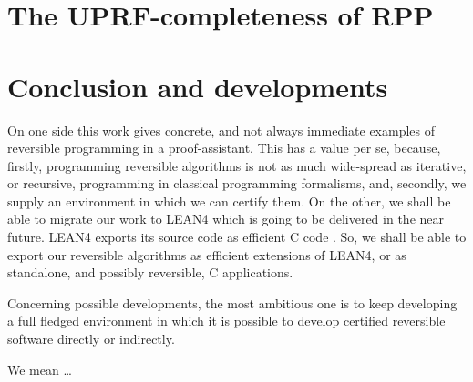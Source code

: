 \documentclass[runningheads]{llncs}
\newcommand{\RPP}{\textsf{RPP}\xspace}
\newcommand{\UPRF}{\textsf{UPRF}\xspace}
\newcommand{\CPP}{\textsf{C}\xspace}
\newcommand{\LEANFour}{\textsf{LEAN4}\xspace}
\begin{document}
\section{The \UPRF-completeness of \RPP}
\label{section:The UPRF-completeness of RPP}

\section{Conclusion and developments}
\label{section:Conclusion and developments}
On one side this work gives concrete, and not always immediate examples of reversible programming in a proof-assistant. This has a value per se, because, firstly, programming reversible algorithms is not as much wide-spread as iterative, or recursive, programming in classical programming formalisms, and, secondly, we supply an environment in which we can certify them.
On the other, we shall be able to migrate our work to \LEANFour which is going to be delivered in the near future. \LEANFour exports its source code as efficient \CPP code \cite{2021-LEAN4-MouraUllrich}. So, we shall be able to export our reversible algorithms as efficient extensions of \LEANFour, or as standalone, and possibly reversible, \CPP applications.

Concerning possible developments, the most ambitious one is to keep developing a full fledged environment in which it is possible to develop certified reversible software directly or indirectly.

We mean \ldots




\end{document}

